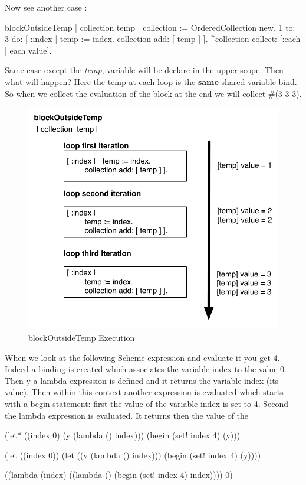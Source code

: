 \documentclass[a4paper,10pt,twoside]{book}
\begin{document}
\newpage
Now see another case : 
\begin{code}{}
blockOutsideTemp
		| collection temp |
		collection := OrderedCollection new.
		1 to: 3 do: [ :index | 
			temp := index. 
			collection add: [ temp ] ].
		^collection collect: [:each | each value].
\end{code}
Same case except the \emph{temp}, variable will be  declare in the upper scope. Then what will happen? Here the temp at each loop is the \textbf{same} shared variable bind. So when we collect the evaluation of the block at the end we will collect \#(3 3 3).
\begin{figure}[htbp]
	\centering
		\includegraphics[width=0.7\linewidth]{blockClosureOutsideTemp}
	\caption{blockOutsideTemp Execution}
	\label{fig:blockClosureOutsideTemp}
\end{figure}




When we look at the following Scheme expression and evaluate it you get 4. Indeed a binding is created 
which associates the variable index to the value 0. Then y a lambda expression is defined and it returns
 the variable index (its value). Then within this context another expression is evaluated which starts
with a begin statement: first the value of the variable index is set to 4. Second the lambda expression is 
evaluated. It returns then the value of the 

\begin{code}{}
(let* ((index 0)
       (y (lambda () index)))
  (begin
    (set! index 4)
    (y)))
\end{code}

\begin{code}{}
(let ((index 0))
  (let ((y (lambda () index)))
    (begin
      (set! index 4)
      (y))))
\end{code}

\begin{code}{}
((lambda (index)
   ((lambda () (begin 
                (set! index 4)
                index))))
 0)
\end{code}

\ifx\wholebook\relax\else
   
   
\end{document}
